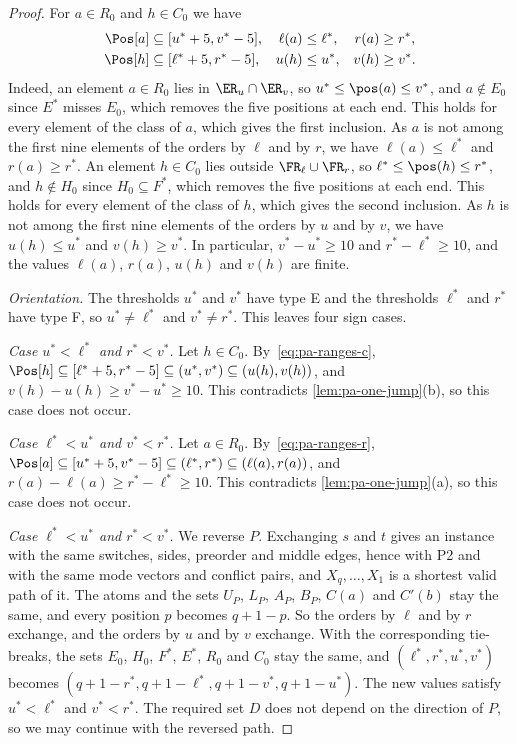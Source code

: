 \begin{proof}
For $a \in R_0$ and $h \in C_0$ we have
\begin{align}
\label{eq:pa-ranges-r}
\Pos[a] &\subseteq [u^* + 5, v^* - 5], & \ell(a) &\leq \ell^*, & r(a) &\geq r^*,\\
\label{eq:pa-ranges-c}
\Pos[h] &\subseteq [\ell^* + 5, r^* - 5], & u(h) &\leq u^*, & v(h) &\geq v^*.
\end{align}
Indeed, an element $a \in R_0$ lies in $\ER_u \cap \ER_v$, so $u^* \leq \pos(a) \leq v^*$, and $a \notin E_0$ since $E^*$ misses $E_0$, which removes the five positions at each end.
This holds for every element of the class of $a$, which gives the first inclusion.
As $a$ is not among the first nine elements of the orders by $\ell$ and by $r$, we have $\ell(a) \leq \ell^*$ and $r(a) \geq r^*$.
An element $h \in C_0$ lies outside $\FR_\ell \cup \FR_r$, so $\ell^* \leq \pos(h) \leq r^*$, and $h \notin H_0$ since $H_0 \subseteq F^*$, which removes the five positions at each end.
This holds for every element of the class of $h$, which gives the second inclusion.
As $h$ is not among the first nine elements of the orders by $u$ and by $v$, we have $u(h) \leq u^*$ and $v(h) \geq v^*$.
In particular, $v^* - u^* \geq 10$ and $r^* - \ell^* \geq 10$, and the values $\ell(a)$, $r(a)$, $u(h)$ and $v(h)$ are finite.

\emph{Orientation.}
The thresholds $u^*$ and $v^*$ have type E and the thresholds $\ell^*$ and $r^*$ have type F, so $u^* \neq \ell^*$ and $v^* \neq r^*$.
This leaves four sign cases.

\emph{Case $u^* < \ell^*$ and $r^* < v^*$.}
Let $h \in C_0$.
By~\eqref{eq:pa-ranges-c}, $\Pos[h] \subseteq [\ell^* + 5, r^* - 5] \subseteq (u^*, v^*) \subseteq (u(h), v(h))$, and $v(h) - u(h) \geq v^* - u^* \geq 10$.
This contradicts \cref{lem:pa-one-jump}(b), so this case does not occur.

\emph{Case $\ell^* < u^*$ and $v^* < r^*$.}
Let $a \in R_0$.
By~\eqref{eq:pa-ranges-r}, $\Pos[a] \subseteq [u^* + 5, v^* - 5] \subseteq (\ell^*, r^*) \subseteq (\ell(a), r(a))$, and $r(a) - \ell(a) \geq r^* - \ell^* \geq 10$.
This contradicts \cref{lem:pa-one-jump}(a), so this case does not occur.

\emph{Case $\ell^* < u^*$ and $r^* < v^*$.}
We reverse $P$.
Exchanging $s$ and $t$ gives an instance with the same switches, sides, preorder and middle edges, hence with P2 and with the same mode vectors and conflict pairs, and $X_q, \dots, X_1$ is a shortest valid path of it.
The atoms and the sets $U_P$, $L_P$, $A_P$, $B_P$, $C(a)$ and $C'(b)$ stay the same, and every position $p$ becomes $q + 1 - p$.
So the orders by $\ell$ and by $r$ exchange, and the orders by $u$ and by $v$ exchange.
With the corresponding tie-breaks, the sets $E_0$, $H_0$, $F^*$, $E^*$, $R_0$ and $C_0$ stay the same, and $(\ell^*, r^*, u^*, v^*)$ becomes $(q + 1 - r^*, q + 1 - \ell^*, q + 1 - v^*, q + 1 - u^*)$.
The new values satisfy $u^* < \ell^*$ and $v^* < r^*$.
The required set $D$ does not depend on the direction of $P$, so we may continue with the reversed path.


\end{proof}
